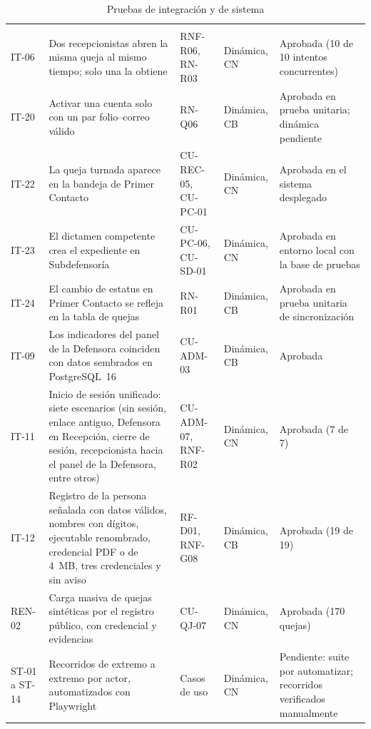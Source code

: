 	\small
	\renewcommand{\arraystretch}{1.2}
	\setlength{\tabcolsep}{4pt}
	\begin{longtable}{|p{1.2cm}|L{6.2cm}|L{2.2cm}|L{2.0cm}|L{2.9cm}|}
		\caption{Pruebas de integración y de sistema}
		\label{tab:pruebas_integracion} \\
		\hline
		 &  &  &
		 &  \\
		\hline
		\endfirsthead
		\hline
		 &  &  &
		 &  \\
		\hline
		\endhead
		IT-06 & Dos recepcionistas abren la misma queja al mismo tiempo; solo una la obtiene &
		RNF-R06, RN-R03 & Dinámica, CN & Aprobada (10 de 10 intentos concurrentes) \\ \hline
		IT-20 & Activar una cuenta solo con un par folio--correo válido & RN-Q06 & Dinámica, CB &
		Aprobada en prueba unitaria; dinámica pendiente \\ \hline
		IT-22 & La queja turnada aparece en la bandeja de Primer Contacto & CU-REC-05, CU-PC-01 & Dinámica,
		CN & Aprobada en el sistema desplegado \\ \hline
		IT-23 & El dictamen competente crea el expediente en Subdefensoría & CU-PC-06, CU-SD-01 & Dinámica,
		CN & Aprobada en entorno local con la base de pruebas \\ \hline
		IT-24 & El cambio de estatus en Primer Contacto se refleja en la tabla de quejas & RN-R01 &
		Dinámica, CB & Aprobada en prueba unitaria de sincronización \\ \hline
		IT-09 & Los indicadores del panel de la Defensora coinciden con datos sembrados en PostgreSQL~16 &
		CU-ADM-03 & Dinámica, CB & Aprobada \\ \hline
		IT-11 & Inicio de sesión unificado: siete escenarios (sin sesión, enlace antiguo, Defensora en
		Recepción, cierre de sesión, recepcionista hacia el panel de la Defensora, entre otros) & CU-ADM-07,
		RNF-R02 & Dinámica, CN & Aprobada (7 de 7) \\ \hline
		IT-12 & Registro de la persona señalada con datos válidos, nombres con dígitos, ejecutable
		renombrado, credencial PDF o de 4~MB, tres credenciales y sin aviso & RF-D01, RNF-G08 & Dinámica,
		CB & Aprobada (19 de 19) \\ \hline
		REN-02 & Carga masiva de quejas sintéticas por el registro público, con credencial y evidencias &
		CU-QJ-07 & Dinámica, CN & Aprobada (170 quejas) \\ \hline
		ST-01 a ST-14 & Recorridos de extremo a extremo por actor, automatizados con Playwright & Casos de
		uso & Dinámica, CN & Pendiente: suite por automatizar; recorridos verificados manualmente \\ \hline
	\end{longtable}
	\normalsize

